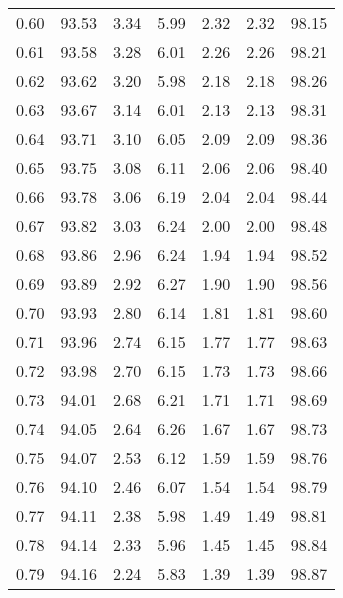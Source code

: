 \begin{tabular}{|c|c|c|c|c|c|c|}
      0.60 &     93.53 &      3.34 &       5.99 &    2.32 &       2.32 &         98.15 \\
      0.61 &     93.58 &      3.28 &       6.01 &    2.26 &       2.26 &         98.21 \\
      0.62 &     93.62 &      3.20 &       5.98 &    2.18 &       2.18 &         98.26 \\
      0.63 &     93.67 &      3.14 &       6.01 &    2.13 &       2.13 &         98.31 \\
      0.64 &     93.71 &      3.10 &       6.05 &    2.09 &       2.09 &         98.36 \\
      0.65 &     93.75 &      3.08 &       6.11 &    2.06 &       2.06 &         98.40 \\
      0.66 &     93.78 &      3.06 &       6.19 &    2.04 &       2.04 &         98.44 \\
      0.67 &     93.82 &      3.03 &       6.24 &    2.00 &       2.00 &         98.48 \\
      0.68 &     93.86 &      2.96 &       6.24 &    1.94 &       1.94 &         98.52 \\
      0.69 &     93.89 &      2.92 &       6.27 &    1.90 &       1.90 &         98.56 \\
      0.70 &     93.93 &      2.80 &       6.14 &    1.81 &       1.81 &         98.60 \\
      0.71 &     93.96 &      2.74 &       6.15 &    1.77 &       1.77 &         98.63 \\
      0.72 &     93.98 &      2.70 &       6.15 &    1.73 &       1.73 &         98.66 \\
      0.73 &     94.01 &      2.68 &       6.21 &    1.71 &       1.71 &         98.69 \\
      0.74 &     94.05 &      2.64 &       6.26 &    1.67 &       1.67 &         98.73 \\
      0.75 &     94.07 &      2.53 &       6.12 &    1.59 &       1.59 &         98.76 \\
      0.76 &     94.10 &      2.46 &       6.07 &    1.54 &       1.54 &         98.79 \\
      0.77 &     94.11 &      2.38 &       5.98 &    1.49 &       1.49 &         98.81 \\
      0.78 &     94.14 &      2.33 &       5.96 &    1.45 &       1.45 &         98.84 \\
      0.79 &     94.16 &      2.24 &       5.83 &    1.39 &       1.39 &         98.87 \\

\end{tabular}

